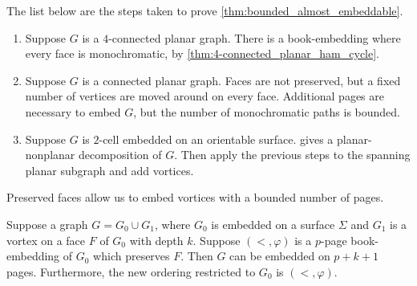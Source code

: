 The list below are the steps taken to prove \cref{thm:bounded_almost_embeddable}.
\begin{enumerate}
	\item Suppose $G$ is a \(4\)-connected planar graph. There is a book-embedding where every face is monochromatic, by \cref{thm:4-connected_planar_ham_cycle}. 
	\item Suppose \(G\) is a connected planar graph. Faces are not preserved, but a fixed number of vertices are moved around on every face. Additional pages are necessary to embed $G$, but the number of monochromatic paths is bounded. 
	\item Suppose \(G\) is $2$-cell embedded on an orientable surface. \textcite{heathPagenumberGenusGraphs1992} gives a planar-nonplanar decomposition of $G$. Then apply the previous steps to the spanning planar subgraph and add vortices.
\end{enumerate}

Preserved faces allow us to embed vortices with a bounded number of pages. 

\begin{lemma}\label{lem:preserved_faces_pagenumber}
	Suppose a graph \(G = G_0 \cup G_1\), where \(G_0\) is embedded on a surface $\Sigma$ and \(G_1\) is a vortex on a face $F$ of $G_0$ with depth \(k\). Suppose $(<, \varphi)$ is a $p$-page book-embedding of \(G_0\) which preserves \(F\). Then $G$ can be embedded on \(p + k + 1\) pages. Furthermore, the new ordering restricted to $G_0$ is $(<, \varphi)$.
\end{lemma}

